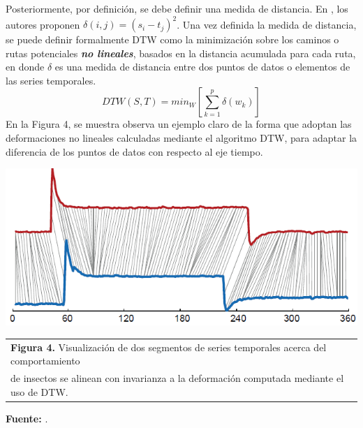 Posteriormente, por definici\'on, se debe definir una medida de distancia. En \cite{dtw}, los autores proponen $\delta(i,j) = (s_i - t_j)^2$. Una vez definida la medida de distancia, se puede definir formalmente DTW como la minimizaci\'on sobre los caminos o rutas potenciales \textbf{\textit{no lineales}}, basados en la distancia acumulada para cada ruta, en donde $\delta$ es una medida de distancia entre dos puntos de datos o elementos de las series temporales.
\begin{equation}
DTW (S,T) = min_W[\sum\limits_{k=1}^{p}\delta(w_k)]
\end{equation}
En la Figura 4, se muestra observa un ejemplo claro de la forma que adoptan las deformaciones no lineales calculadas mediante el algoritmo DTW, para adaptar la diferencia de los puntos de datos con respecto al eje tiempo.
\begin{center}
\includegraphics[scale=0.7]{dtw2.png}\\
\vspace*{10pt}
\footnotesize{
\begin{tabular}{l}
\textbf{Figura 4.} Visualizaci\'on de dos segmentos de series temporales
acerca del comportamiento\\ de insectos se alinean con invarianza a la deformaci\'on computada mediante el uso de DTW.
\end{tabular}{}
}
\textbf{Fuente:} \cite{dtw}.
\end{center}
